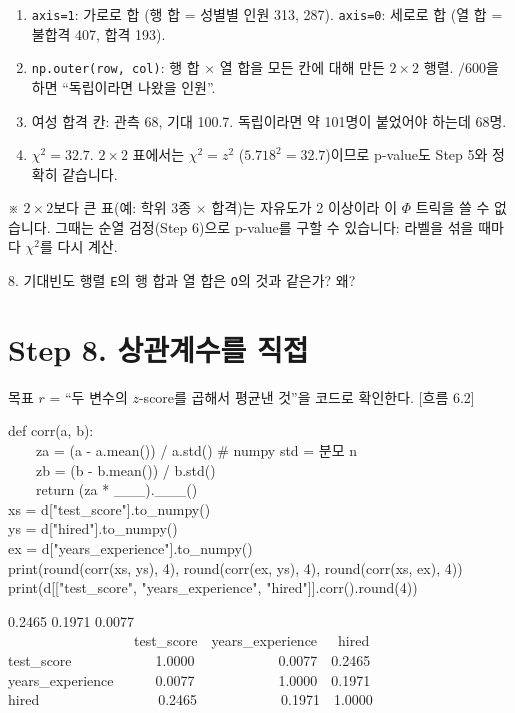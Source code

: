 \documentclass[11pt,a4paper]{article}
\newcommand{\code}[1]{\texttt{#1}}
\newcommand{\aside}[1]{{\footnotesize\color{black!65}#1}}
\newcommand{\Wc}[1]{{\scriptsize\textsf{\color{blue!60!black}[흐름 #1]}}}
\begin{document}
\begin{howbox}
\begin{enumerate}
\item \code{axis=1}: 가로로 합 (행 합 = 성별별 인원 313, 287). \code{axis=0}: 세로로 합 (열 합 = 불합격 407, 합격 193).
\item \code{np.outer(row, col)}: 행 합 $\times$ 열 합을 모든 칸에 대해 만든 $2\times2$ 행렬. $/600$을 하면 ``독립이라면 나왔을 인원''.
\item 여성 합격 칸: 관측 68, 기대 100.7. 독립이라면 약 101명이 붙었어야 하는데 68명.
\item $\chi^2=32.7$. $2\times2$ 표에서는 $\chi^2=z^2$ ($5.718^2=32.7$)이므로 p-value도 Step 5와 정확히 같습니다.
\end{enumerate}
\end{howbox}
\aside{※ $2\times2$보다 큰 표(예: 학위 3종 $\times$ 합격)는 자유도가 2 이상이라 이 $\Phi$ 트릭을 쓸 수 없습니다. 그때는 순열 검정(Step 6)으로 p-value를 구할 수 있습니다: 라벨을 섞을 때마다 $\chi^2$를 다시 계산.}

\begin{qbox}
8. 기대빈도 행렬 \code{E}의 행 합과 열 합은 \code{O}의 것과 같은가? 왜?
\end{qbox}

\section{Step 8. 상관계수를 직접}
\begin{goalbox}{목표}
$r$ = ``두 변수의 $z$-score를 곱해서 평균낸 것''을 코드로 확인한다. \Wc{6.2}
\end{goalbox}

\begin{codebox}
def corr(a, b):\\
\ \ \ \ za = (a - a.mean()) / a.std() \hfill \# numpy std = 분모 n\\
\ \ \ \ zb = (b - b.mean()) / b.std()\\
\ \ \ \ return (za * \_\_\_).\_\_\_()\\[3pt]
xs = d["test\_score"].to\_numpy()\\
ys = d["hired"].to\_numpy()\\
ex = d["years\_experience"].to\_numpy()\\
print(round(corr(xs, ys), 4), round(corr(ex, ys), 4), round(corr(xs, ex), 4))\\
print(d[["test\_score", "years\_experience", "hired"]].corr().round(4))
\end{codebox}
\begin{outbox}
0.2465 0.1971 0.0077\\
\ \ \ \ \ \ \ \ \ \ \ \ \ \ \ \ \ \ test\_score\ \ years\_experience\ \ \ hired\\
test\_score\ \ \ \ \ \ \ \ \ \ \ \ 1.0000\ \ \ \ \ \ \ \ \ \ \ \ 0.0077\ \ 0.2465\\
years\_experience\ \ \ \ \ \ 0.0077\ \ \ \ \ \ \ \ \ \ \ \ 1.0000\ \ 0.1971\\
hired\ \ \ \ \ \ \ \ \ \ \ \ \ \ \ \ \ 0.2465\ \ \ \ \ \ \ \ \ \ \ \ 0.1971\ \ 1.0000
\end{outbox}
\end{document}
